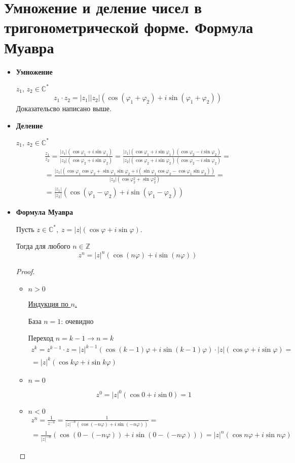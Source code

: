 \section{Умножение и деление чисел в тригонометрической форме. Формула Муавра}
\begin{itemize}
    \item \textbf{Умножение} 
  
    $z_1,\, z_2 \in \mathbb{C}^*$
    \[ z_1 \cdot z_2 = |z_1||z_2|(\cos(\varphi_1 + \varphi_2) + i\sin(\varphi_1 + \varphi_2)) \]
    Доказательсво написано выше.
    \item \textbf{Деление} 

    $z_1,\, z_2 \in \mathbb{C}^*$
    \begin{gather*}
        \frac{z_1}{z_2} = \frac{|z_1|(\cos\varphi_1 + i\sin\varphi_1)}{|z_2|(\cos\varphi_2 + i\sin\varphi_2)} = \frac{|z_1|(\cos\varphi_1 + i\sin\varphi_1)(\cos\varphi_2 - i\sin\varphi_2)}{|z_2|(\cos\varphi_2 + i\sin\varphi_2)(\cos\varphi_2 - i\sin\varphi_2)} = \\
        = \frac{|z_1|(\cos\varphi_1\cos\varphi_2 + \sin\varphi_1\sin\varphi_2 + i(\sin\varphi_1\cos\varphi_2 - \cos\varphi_1\sin\varphi_2))}{|z_2|(\cos\varphi_2^2 + \sin\varphi_2^2)} = \\
        = \frac{|z_1|}{|z_2|}(\cos(\varphi_1 - \varphi_2) + i\sin(\varphi_1 - \varphi_2))
    \end{gather*}
    \item \textbf{Формула Муавра}
  
    Пусть $z \in \mathbb{C}^*,\; z = |z|(\cos\varphi + i\sin\varphi)$. 

    Тогда для любого $n \in \mathbb{Z}$
    \[ z^n = |z|^n(\cos(n\varphi) + i\sin(n\varphi)) \]
    \begin{proof} \quad
        \begin{itemize}
            \item $n > 0$
      
            \underline{Индукция по $n$.}

            База $n = 1$: очевидно

            Переход $n = k - 1 \to n = k$
            \begin{gather*}
                z^k = z^{k-1} \cdot z = |z|^{k-1}(\cos(k - 1)\varphi + i\sin(k - 1)\varphi) \cdot |z|(\cos\varphi + i\sin\varphi) =  \\
                = |z|^k(\cos k\varphi + i\sin k\varphi)    
            \end{gather*}
            \item $n = 0$
      
            \[ z^0 = |z|^0(\cos 0 + i\sin 0) = 1 \]
            \item $n < 0$
            \begin{gather*}
                z^n = \frac{1}{z^{-n}} = \frac{1}{|z|^{-n}(\cos(-n\varphi) + i\sin(-n\varphi))} = \\
                = \frac{1}{|z|^{-n}}(\cos(0 - (-n\varphi)) + i\sin(0 - (-n\varphi))) = |z|^n(\cos n\varphi + i\sin n\varphi)
            \end{gather*}
        \end{itemize}
    \end{proof}
\end{itemize}